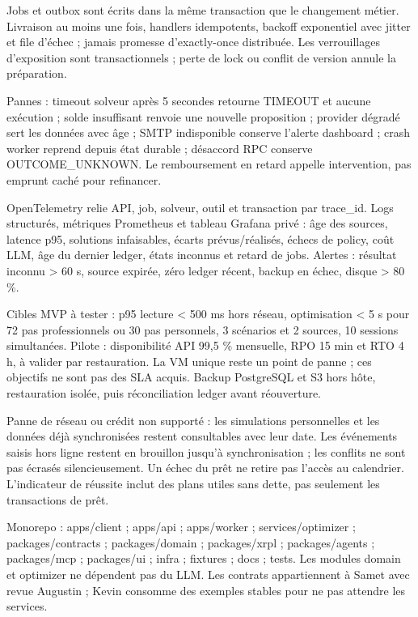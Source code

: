 \documentclass[10pt,a4paper]{article}
\makeatletter
\renewcommand\section{\@startsection{section}{1}{0pt}{16pt plus 2pt minus 1pt}{8pt}{\displayfont\fontsize{16}{20}\selectfont\color{forest}}}
\makeatother
\begin{document}
Jobs et outbox sont écrits dans la même transaction que le changement métier. Livraison au moins une fois, handlers idempotents, backoff exponentiel avec jitter et file d'échec ; jamais promesse d'exactly-once distribuée. Les verrouillages d'exposition sont transactionnels ; perte de lock ou conflit de version annule la préparation.\par

Pannes : timeout solveur après 5 secondes retourne TIMEOUT et aucune exécution ; solde insuffisant renvoie une nouvelle proposition ; provider dégradé sert les données avec âge ; SMTP indisponible conserve l'alerte dashboard ; crash worker reprend depuis état durable ; désaccord RPC conserve OUTCOME\_\allowbreak UNKNOWN. Le remboursement en retard appelle intervention, pas emprunt caché pour refinancer.\par

OpenTelemetry relie API, job, solveur, outil et transaction par trace\_\allowbreak id. Logs structurés, métriques Prometheus et tableau Grafana privé : âge des sources, latence p95, solutions infaisables, écarts prévus/réalisés, échecs de policy, coût LLM, âge du dernier ledger, états inconnus et retard de jobs. Alertes : résultat inconnu > 60 s, source expirée, zéro ledger récent, backup en échec, disque > 80 \%.\par

Cibles MVP à tester : p95 lecture < 500 ms hors réseau, optimisation < 5 s pour 72 pas professionnels ou 30 pas personnels, 3 scénarios et 2 sources, 10 sessions simultanées. Pilote : disponibilité API 99,5 \% mensuelle, RPO 15 min et RTO 4 h, à valider par restauration. La VM unique reste un point de panne ; ces objectifs ne sont pas des SLA acquis. Backup PostgreSQL et S3 hors hôte, restauration isolée, puis réconciliation ledger avant réouverture.\par

Panne de réseau ou crédit non supporté : les simulations personnelles et les données déjà synchronisées restent consultables avec leur date. Les événements saisis hors ligne restent en brouillon jusqu'à synchronisation ; les conflits ne sont pas écrasés silencieusement. Un échec du prêt ne retire pas l'accès au calendrier. L'indicateur de réussite inclut des plans utiles sans dette, pas seulement les transactions de prêt.\par

\section{CI CD et organisation du dépôt}\label{ch:23}
Monorepo : apps/client ; apps/api ; apps/worker ; services/optimizer ; packages/contracts ; packages/domain ; packages/xrpl ; packages/agents ; packages/mcp ; packages/ui ; infra ; fixtures ; docs ; tests. Les modules domain et optimizer ne dépendent pas du LLM. Les contrats appartiennent à Samet avec revue Augustin ; Kevin consomme des exemples stables pour ne pas attendre les services.\par
\end{document}
